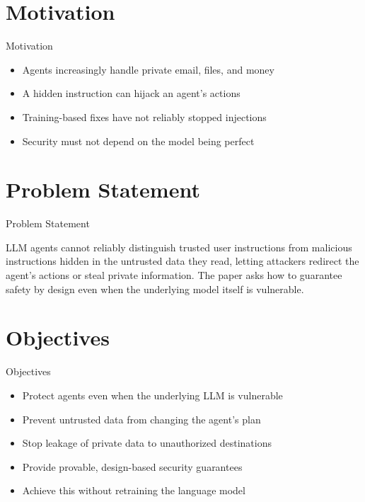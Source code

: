 \documentclass[10pt]{beamer}
\begin{document}
\section{Motivation}
\begin{frame}{Motivation}
\begin{itemize}
  \item Agents increasingly handle private email, files, and money
  \item A hidden instruction can hijack an agent's actions
  \item Training-based fixes have not reliably stopped injections
  \item Security must not depend on the model being perfect
\end{itemize}
\end{frame}

\section{Problem Statement}
\begin{frame}{Problem Statement}
  \begin{block}{}
  LLM agents cannot reliably distinguish trusted user instructions from malicious instructions hidden in the untrusted data they read, letting attackers redirect the agent's actions or steal private information. The paper asks how to guarantee safety by design even when the underlying model itself is vulnerable.
  \end{block}
\end{frame}

\section{Objectives}
\begin{frame}{Objectives}
\begin{itemize}
  \item Protect agents even when the underlying LLM is vulnerable
  \item Prevent untrusted data from changing the agent's plan
  \item Stop leakage of private data to unauthorized destinations
  \item Provide provable, design-based security guarantees
  \item Achieve this without retraining the language model
\end{itemize}
\end{frame}
\end{document}
